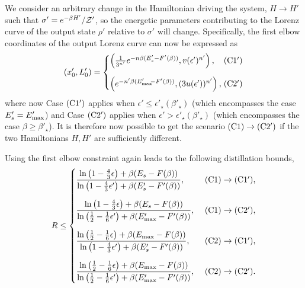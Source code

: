\documentclass[pra,
aps,
twocolumn,
superscriptaddress,
groupedaddress,
nofootinbib,
reprint
]{revtex4-1}
\begin{document}
We consider an arbitrary change in the Hamiltonian driving the system, $H\rightarrow H'$ such that $\sigma' = e^{-\beta H'}/\mathcal{Z}'$, so the energetic parameters contributing to the Lorenz curve of the output state $\rho'$ relative to $\sigma'$ will change. 
Specifically, the first elbow coordinates of the output Lorenz curve can now be expressed as
\begin{equation}\label{eq:transformed_first_elb_coords}
	(x'_0, L'_0) =
	\begin{cases}
		\left(\frac{1}{3^{n'}} e^{-n\beta (E'_s - F'(\beta))}, v(\epsilon')^{n'} \right), &\hspace{-7pt} \rm{(C1')}	\vspace{10pt}\\
		\left( e^{-n'\beta (E'_{\rm{max}}\hspace{-2.5pt}-F'(\beta))}, (3u(\epsilon'))^{n'} \right), &\hspace{-7pt} \rm{(C2')}
	\end{cases}
\end{equation}
where now Case $\rm{(C1')}$ applies when $\epsilon' \leq \epsilon'_\star(\beta'_\star)$ (which encompasses the case $E'_s = E'_{\rm{max}}$) and Case $\rm{(C2')}$ applies when $\epsilon' > \epsilon'_\star(\beta'_\star)$ (which encompasses the case $\beta \geq \beta'_\star$).
It is therefore now possible to get the scenario $\rm{(C1)} \rightarrow \rm{(C2')}$ if the two Hamiltonians $H,H'$ are sufficiently different.

Using the first elbow constraint again leads to the following distillation bounds,
\begin{equation}\label{eq:rate_bounds_proof}
	R \leq
	\begin{cases}
		\dfrac{\ln{\big( 1-\frac{4}{3}\epsilon \big)} + \beta (E_s - F(\beta))}{\ln{\big( 1-\frac{4}{3}\epsilon' \big)} + \beta (E'_s - F'(\beta))},\ &\rm{(C1)} \rightarrow \rm{(C1')}, \vspace{10pt}\\
		\dfrac{\ln{\big( 1-\frac{4}{3}\epsilon \big)} + \beta (E_s - F(\beta))}{\ln{\big( \frac{1}{2}-\frac{1}{6}\epsilon' \big)} + \beta (E'_{\rm{max}} - F'(\beta))},\ &\rm{(C1)} \rightarrow \rm{(C2')}, \vspace{10pt}\\
		\dfrac{\ln{\big( \frac{1}{2}-\frac{1}{6}\epsilon \big)} + \beta (E_{\rm{max}} - F(\beta))}{\ln{\big( 1-\frac{4}{3}\epsilon' \big)} + \beta (E'_s - F'(\beta))},\ &\rm{(C2)} \rightarrow \rm{(C1')}, \vspace{10pt}\\
		\dfrac{\ln{\big( \frac{1}{2}-\frac{1}{6}\epsilon \big)} + \beta (E_{\rm{max}} - F(\beta))}{\ln{\big( \frac{1}{2}-\frac{1}{6}\epsilon' \big)} + \beta (E'_{\rm{max}} - F'(\beta))},\ &\rm{(C2)} \rightarrow \rm{(C2')}.
	\end{cases}
\end{equation}
\end{document}
